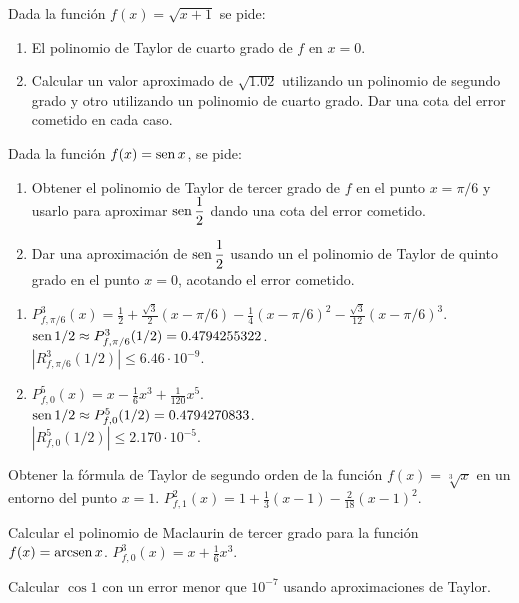 
{Dada la función $f(x)=\sqrt{x+1}$ se pide:
\begin{enumerate}
\item  El polinomio de Taylor de cuarto grado de $f$ en $x=0$.
\item  Calcular un valor aproximado de $\sqrt{1.02}$ utilizando un polinomio de segundo grado y otro utilizando un polinomio de cuarto grado. Dar una cota del error cometido en cada caso.
\end{enumerate}
}


{Dada la función $f(x)=\operatorname{sen} x$, se pide:
\begin{enumerate}
\item  Obtener el polinomio de Taylor de tercer grado de $f$ en el punto $x=\pi/6$ y usarlo para aproximar $\operatorname{sen}\dfrac{1}{2}$ dando una cota del error cometido.
\item  Dar una aproximación de $\operatorname{sen}\dfrac{1}{2}$ usando un el polinomio de Taylor de quinto grado en el punto $x=0$, acotando el error cometido.
\end{enumerate}
}
{
\begin{enumerate}
\item $P^3_{f,\pi/6}(x) = \frac{1}{2}+\frac{\sqrt{3}}{2}(x-\pi/6)-\frac{1}{4}(x-\pi/6)^2-\frac{\sqrt{3}}{12}(x-\pi/6)^3$.\\
$\operatorname{sen} 1/2 \approx P^3_{f,\pi/6}(1/2) = 0.4794255322$.\\
$|R^3_{f,\pi/6}(1/2)|\leq 6.46\cdot 10^{-9}$.
\item $P^5_{f,0}(x) = x -\frac{1}{6} x^3 + \frac{1}{120}x^5$.\\
$\operatorname{sen} 1/2 \approx P^5_{f,0}(1/2) = 0.4794270833$.\\
$|R^5_{f,0}(1/2)|\leq 2.170\cdot 10^{-5}$.
\end{enumerate}
}
{
}


{Obtener la fórmula de Taylor de segundo orden de la función $f(x)=\sqrt[3]{x}$ en un entorno del punto $x=1$.
}
{$P^2_{f,1}(x) = 1+\frac{1}{3}(x-1)-\frac{2}{18}(x-1)^2$.
}
{
}


{Calcular el polinomio de Maclaurin de tercer grado para la función $f(x)=\operatorname{arcsen} x$.
}
{$P^3_{f,0}(x) = x+\frac{1}{6}x^3$.
}
{
}


{Calcular $\cos 1$ con un error menor que $10^{-7}$ usando aproximaciones de Taylor.
}


